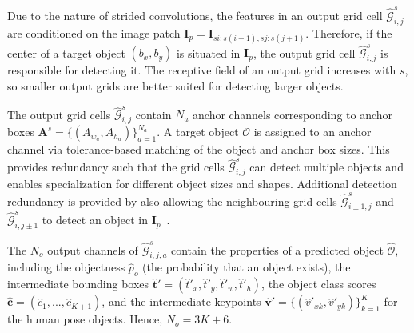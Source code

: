 \documentclass[runningheads]{llncs}
\begin{document}
Due to the nature of strided convolutions, the features in an output grid cell $\hat{\mathcal{G}}^s_{i,j}$ are conditioned on the image patch $\mathbf{I}_p=\mathbf{I}_{si:s(i+1), sj:s(j+1)}$. Therefore, if the center of a target object $(b_x, {b_y})$ is situated in $\mathbf{I}_p$, the output grid cell $\hat{\mathcal{G}}^s_{i,j}$ is responsible for detecting it. 
The receptive field of an output grid increases with $s$, so smaller output grids are better suited for detecting larger objects. 


The output grid cells $\hat{\mathcal{G}}^s_{i,j}$ contain $N_a$ anchor channels corresponding to anchor boxes $\mathbf{A}^s = \{(A_{w_a}, A_{h_a})\}_{a=1}^{N_a}$. A target object $\mathcal{O}$ is assigned to an anchor channel via tolerance-based matching of the object and anchor box sizes. This provides redundancy such that the grid cells $\hat{\mathcal{G}}^s_{i,j}$ can detect multiple objects and enables specialization for different object sizes and shapes. Additional detection redundancy is provided by also allowing the neighbouring grid cells $\hat{\mathcal{G}}^s_{i\pm1,j}$ and $\hat{\mathcal{G}}^s_{i,j\pm1}$ to detect an object in $\mathbf{I}_p$~\cite{wang2020scaled, glenn_jocher_2021_4679653}.

The $N_o$ output channels of $\hat{\mathcal{G}}^s_{i,j,a}$ contain the properties of a predicted object $\hat{\mathcal{O}}$, including the objectness $\hat{p}_{o}$ (the probability that an object exists), the intermediate bounding boxes $\hat{\mathbf{t}}'= (\hat{t}'_x, \hat{t}'_y, \hat{t}'_w, \hat{t}'_h)$, the object class scores $\mathbf{\hat{c}} = (\hat{c}_1, ..., \hat{c}_{K+1})$, and the intermediate keypoints $\hat{\mathbf{v}}'= \{(\hat{v}'_{xk}, \hat{v}'_{yk})\}_{k=1}^K$ for the human pose objects. Hence, $N_o = 3K + 6$.
\end{document}
